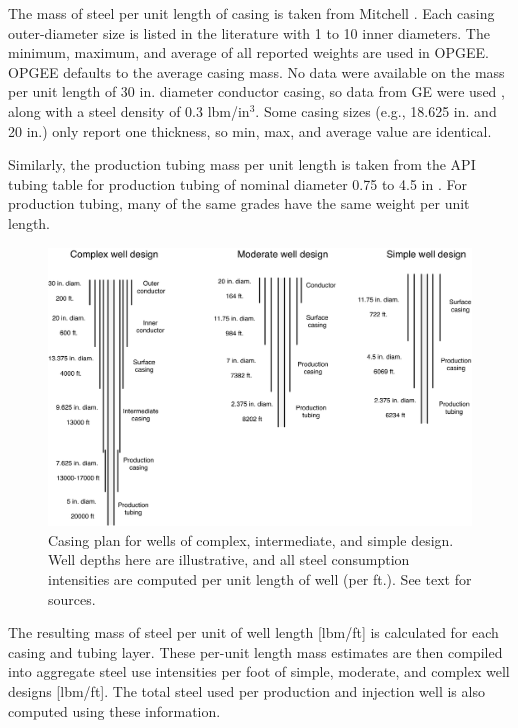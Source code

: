 \documentclass[11pt]{report}
\begin{document}
The mass of steel per unit length of casing is taken from Mitchell \cite[Table 7.10]{Mitchell2006}. Each casing outer-diameter size is listed in the literature with 1 to 10 inner diameters. The minimum, maximum, and average of all reported weights are used in OPGEE. OPGEE defaults to the average casing mass. No data were available on the mass per unit length of 30 in. diameter conductor casing, so data from GE were used \cite{GE2014}, along with a steel density of 0.3 lbm/in$^3$. Some casing sizes (e.g., 18.625 in. and 20 in.) only report one thickness, so min, max, and average value are identical.

Similarly, the production tubing mass per unit length is taken from the API tubing table for production tubing of nominal diameter 0.75 to 4.5 in \cite{API2014}. For production tubing, many of the same grades have the same weight per unit length.

\begin{figure}[t]
\includegraphics[width=1\columnwidth]{images/all_well_casing.pdf}
\caption{Casing plan for wells of complex, intermediate, and simple design. Well depths here are illustrative, and all steel consumption intensities are computed per unit length of well (per ft.). See text for sources.}
\label{fig:casing_all}
\end{figure}

The resulting mass of steel per unit of well length [lbm/ft] is calculated for each casing and tubing layer. These per-unit length mass estimates are then compiled into aggregate steel use intensities per foot of simple, moderate, and complex well designs [lbm/ft]. The total steel used per production  and injection well is also computed using these information.
\end{document}
